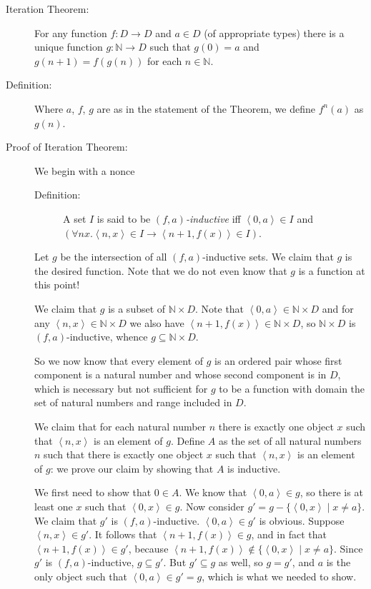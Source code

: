 \documentclass[12pt]{book}
\begin{document}
\begin{description}

\item[Iteration Theorem:] For any function $f:D \rightarrow D$ and $a \in D$ (of appropriate
types) there is a unique function $g:{\mathbb N}\rightarrow D$ such
that $g(0)=a$ and $g(n+1) = f(g(n))$ for each $n \in {\mathbb N}$.

\item[Definition:] Where $a$, $f$, $g$ are as in the statement of the
Theorem, we define $f^n(a)$ as $g(n)$.

\item[Proof of Iteration Theorem:]

We begin with a nonce

\begin{description}

\item[Definition:] A set $I$ is said to be {\em $(f,a)$-inductive\/}
iff $\left<0,a\right> \in I$ and $(\forall nx.\left<n,x\right> \in I
\rightarrow \left<n+1,f(x)\right> \in I)$.

\end{description}

Let $g$ be the intersection of all $(f,a)$-inductive sets.  We claim
that $g$ is the desired function.  Note that we do not even know that
$g$ is a function at this point!

We claim that $g$ is a subset of ${\mathbb N}\times D$.  Note that
$\left<0,a\right> \in {\mathbb N} \times D$ and for any
$\left<n,x\right> \in{\mathbb N} \times D$ we also have
$\left<n+1,f(x)\right> \in {\mathbb N} \times D$, so ${\mathbb N}
\times D$ is $(f,a)$-inductive, whence $g \subseteq {\mathbb N}\times
D$.

So we now know that every element of $g$ is an ordered pair whose
first component is a natural number and whose second component is in $D$, which is necessary but not
sufficient for $g$ to be a function with domain the set of natural
numbers and range included in $D$.

We claim that for each natural number $n$ there is exactly one object
$x$ such that $\left<n,x\right>$ is an element of $g$.  Define $A$ as
the set of all natural numbers $n$ such that there is exactly one
object $x$ such that $\left<n,x\right>$ is an element of $g$: we prove
our claim by showing that $A$ is inductive.

We first need to show that $0 \in A$.  We know that
$\left<0,a\right>\in g$, so there is at least one $x$ such that
$\left<0,x\right>\in g$.  Now consider \newline $g' = g- \{\left<0,x\right>\mid
x \neq a\}$.  We claim that $g'$ is 
$(f,a)$-inductive.
$\left<0,a\right> \in g'$ is obvious.  Suppose $\left<n,x\right> \in
g'$.  It follows that $\left<n+1,f(x)\right> \in g$, and in fact that
$\left<n+1,f(x)\right> \in g'$, because $\left<n+1,f(x)\right> \not\in
\{\left<0,x\right>\mid x \neq a\}$.  Since $g'$ is $(f,a)$-inductive,
$g \subseteq g'$.  But $g' \subseteq g$ as well, so $g=g'$, and $a$ is
the only object such that $\left<0,a\right> \in g' = g$, which is what we
needed to show.


\end{description}
\end{document}
